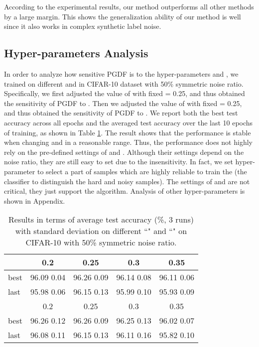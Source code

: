 \documentclass[letterpaper]{article} \usepackage{aaai22}  \usepackage{times}  \usepackage{helvet}  \usepackage{courier}  \usepackage[hyphens]{url}  \usepackage{graphicx} \urlstyle{rm} \def\UrlFont{\rm}  \usepackage{natbib}  \usepackage{caption} \DeclareCaptionStyle{ruled}{labelfont=normalfont,labelsep=colon,strut=off} \frenchspacing  \setlength{\pdfpagewidth}{8.5in}  \setlength{\pdfpageheight}{11in}  \usepackage{algorithm}
\begin{document}
{According to the experimental results, our method outperforms all other methods by a large margin. This shows the generalization ability of our method is well since it also works in complex synthetic label noise.}




\subsection{Hyper-parameters Analysis}

{In order to analyze how sensitive PGDF is to the hyper-parameters  and , we trained on different  and  in CIFAR-10 dataset with 50\% symmetric noise ratio. Specifically, we first adjusted the value of  with fixed  = 0.25, and thus obtained the sensitivity of PGDF to . Then we adjusted the value of  with fixed  = 0.25, and thus obtained the sensitivity of PGDF to . We report both the best test accuracy across all epochs and the averaged test accuracy over the last 10 epochs of training, as shown in Table \ref{exp:parA}. The result shows that the performance is stable when changing  and  in a reasonable range. Thus, the performance does not highly rely on the pre-defined settings of  and . Although their settings depend on the noise ratio, they are still easy to set due to the insensitivity. In fact, we set hyper-parameter  to select a part of samples which are highly reliable to train the  (the classifier to distinguish the hard and noisy samples). The settings of  and  are not critical, they just support the algorithm. Analysis of other hyper-parameters is shown in Appendix.}

\begin{table}[]
\caption{Results in terms of average test accuracy (\%, 3 runs) with standard deviation on different ``" and ``" on CIFAR-10 with 50\% symmetric noise ratio.}
\vskip 0.15in
\scriptsize
\centering
\begin{tabular}{@{}l|cccc@{}}
\toprule
   & 0.2         & 0.25                 & 0.3         & 0.35        \\ \midrule
best & 96.09  0.04 & {96.26  0.09} & 96.14  0.08 & 96.11  0.06 \\
last & 95.98  0.06 & {96.15  0.13} & 95.99  0.10 & 95.93  0.09 \\ \midrule
   & 0.2         & 0.25                 & 0.3         & 0.35        \\ \midrule
best & {96.26  0.12} & {96.26  0.09} & 96.25  0.13 & 96.02  0.07 \\
last & 96.08  0.11 & {96.15  0.13} & 96.11  0.16 & 95.82  0.10 \\ \bottomrule
\end{tabular}
\label{exp:parA}
\vskip -0.1in
\end{table}
\end{document}
